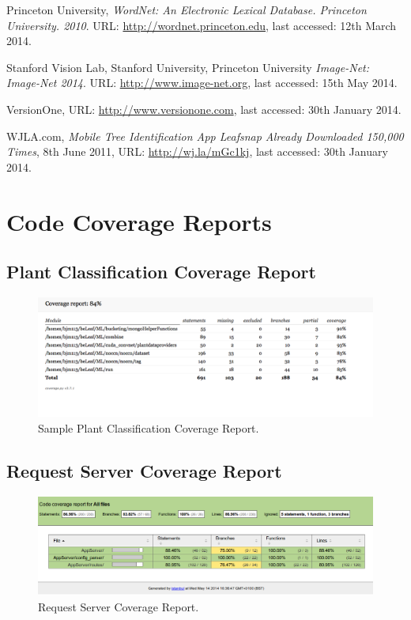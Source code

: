 \documentclass[a4paper,11pt]{article}
\begin{document}
\begin{description}
\begin{thebibliography}{1}
  Princeton University,
  \emph{WordNet: An Electronic Lexical Database. Princeton University. 2010}.
 URL: \url{http://wordnet.princeton.edu}, last accessed: 12th March 2014.

  Stanford Vision Lab, Stanford University, Princeton University
  \emph{Image-Net: Image-Net 2014}.
 URL: \url{http://www.image-net.org}, last accessed: 15th May 2014.

  VersionOne,
  URL: \url{http://www.versionone.com}, last accessed: 30th January 2014.

  WJLA.com, 
  \emph{Mobile Tree Identification App Leafsnap Already Downloaded 150,000 Times}, 8th June 2011,
 URL: \url{http://wj.la/mGc1kj}, last accessed: 30th January 2014.

 
\end{thebibliography}

\clearpage
\appendix
\section{Code Coverage Reports}

\subsection{Plant Classification Coverage Report}
\begin{figure}[h!]
	\centering
	\includegraphics[width=0.7\linewidth]{ml_coverage.png}
	\caption{Sample Plant Classification Coverage Report.}
\end{figure}

\subsection{Request Server Coverage Report}
\begin{figure}[h!]
	\centering
	\includegraphics[width=0.7\linewidth]{request_server_coverage.png}
	\caption{Request Server Coverage Report.}
\end{figure}


\end{description}
\end{document}
